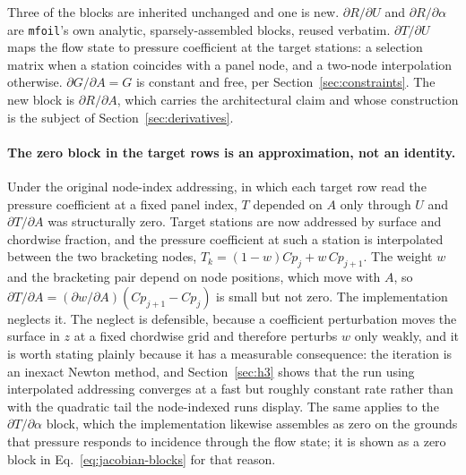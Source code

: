 Three of the blocks are inherited unchanged and one is new.
$\partial R/\partial U$ and $\partial R/\partial\alpha$ are \texttt{mfoil}'s
own analytic, sparsely-assembled blocks, reused verbatim.
$\partial T/\partial U$ maps the flow state to pressure coefficient at the
target stations: a selection matrix when a station coincides with a panel
node, and a two-node interpolation otherwise. $\partial G/\partial A = G$ is
constant and free, per Section~\ref{sec:constraints}. The new block is
$\partial R/\partial A$, which carries the architectural claim and whose
construction is the subject of Section~\ref{sec:derivatives}.

\paragraph{The zero block in the target rows is an approximation, not an
identity.} Under the original node-index addressing, in which each target row
read the pressure coefficient at a fixed panel index, $T$ depended on $A$ only
through $U$ and $\partial T/\partial A$ was structurally zero. Target stations
are now addressed by surface and chordwise fraction, and the pressure
coefficient at such a station is interpolated between the two bracketing
nodes, $T_k = (1-w)Cp_j + w\,Cp_{j+1}$. The weight $w$ and the bracketing pair
depend on node positions, which move with $A$, so
$\partial T/\partial A = (\partial w/\partial A)(Cp_{j+1}-Cp_j)$ is small but
not zero. The implementation neglects it. The neglect is defensible, because a
coefficient perturbation moves the surface in $z$ at a fixed chordwise grid
and therefore perturbs $w$ only weakly, and it is worth stating plainly because
it has a measurable consequence: the iteration is an inexact Newton method,
and Section~\ref{sec:h3} shows that the run using interpolated addressing
converges at a fast but roughly constant rate rather than with the quadratic
tail the node-indexed runs display. The same applies to the
$\partial T/\partial\alpha$ block, which the implementation likewise assembles
as zero on the grounds that pressure responds to incidence through the flow
state; it is shown as a zero block in Eq.~\eqref{eq:jacobian-blocks} for that
reason.

